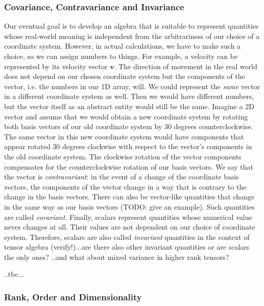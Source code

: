 \subsubsection{Covariance, Contravariance and Invariance}
Our eventual goal is to develop an algebra that is suitable to represent quantities whose real-world meaning is independent from the arbitrariness of our choice of a coordinate system. However, in actual calculations, we have to make such a choice, so we can assign numbers to things. For example, a velocity can be represented by its velocity vector $\mathbf{v}$. The direction of movement in the real world does not depend on our chosen coordinate system but the components of the vector, i.e. the numbers in our 1D array, will. We could represent the \emph{same} vector in a different coordinate system as well. Then we would have different numbers, but the vector itself as an abstract entity would still be the same. Imagine a 2D vector and assume that we would obtain a new coordinate system by rotating both basis vectors of our old coordinate system by 30 degrees counterclockwise. The same vector in this new coordinate system would have components that appear rotated 30 degrees clockwise with respect to the vector's components in the old coordinate system. The clockwise rotation of the vector components compensates for the counterclockwise rotation of our basis vectors. We say that the vector is \emph{contravariant}: in the event of a change of the coordinate basis vectors, the components of the vector change in a way that is contrary to the change in the basis vectors. There can also be vector-like quantities that change in the same way as our basis vectors (TODO: give an example). Such quantities are called \emph{covariant}. Finally, scalars represent quantities whose numerical value never changes at all. Their values are not dependent on our choice of coordinate system. Therefore, scalars are also called \emph{invariant} quantities in the context of tensor algebra (verify!)...are there also other invariant quantities or are scalars the only ones? ..and what about mixed variance in higher rank tensors?


..tbc...

\subsubsection{Rank, Order and Dimensionality}


